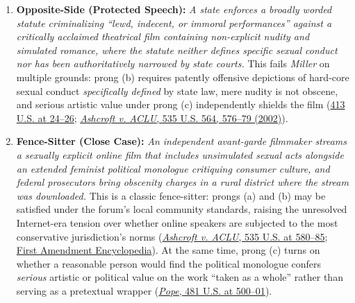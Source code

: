 \documentclass[12pt]{article}
\begin{document}
\begin{enumerate}
\item \textbf{Opposite-Side (Protected Speech):} \textit{A state enforces a broadly worded statute criminalizing ``lewd, indecent, or immoral performances'' against a critically acclaimed theatrical film containing non-explicit nudity and simulated romance, where the statute neither defines specific sexual conduct nor has been authoritatively narrowed by state courts.} This fails \textit{Miller} on multiple grounds: prong (b) requires patently offensive depictions of hard-core sexual conduct \textit{specifically defined} by state law, mere nudity is not obscene, and serious artistic value under prong (c) independently shields the film (\href{https://supreme.justia.com/cases/federal/us/413/15/}{413 U.S. at 24--26}; \href{https://supreme.justia.com/cases/federal/us/535/564/}{\textit{Ashcroft v. ACLU}, 535 U.S. 564, 576--79 (2002)}).

\item \textbf{Fence-Sitter (Close Case):} \textit{An independent avant-garde filmmaker streams a sexually explicit online film that includes unsimulated sexual acts alongside an extended feminist political monologue critiquing consumer culture, and federal prosecutors bring obscenity charges in a rural district where the stream was downloaded.} This is a classic fence-sitter: prongs (a) and (b) may be satisfied under the forum's local community standards, raising the unresolved Internet-era tension over whether online speakers are subjected to the most conservative jurisdiction's norms (\href{https://supreme.justia.com/cases/federal/us/535/564/}{\textit{Ashcroft v. ACLU}, 535 U.S. at 580--85}; \href{https://firstamendment.mtsu.edu/article/community-standards/}{First Amendment Encyclopedia}). At the same time, prong (c) turns on whether a reasonable person would find the political monologue confers \textit{serious} artistic or political value on the work ``taken as a whole'' rather than serving as a pretextual wrapper (\href{https://supreme.justia.com/cases/federal/us/481/497/}{\textit{Pope}, 481 U.S. at 500--01}).
\end{enumerate}
\end{document}
